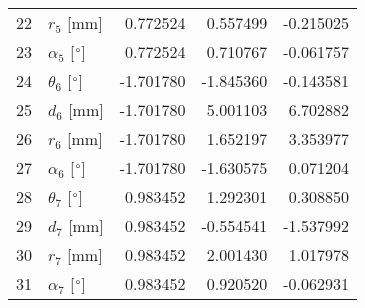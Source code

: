 \documentclass{standalone}%
\begin{document}
\begin{tabular}{llrrr}
22 &              $r_{5}$ [mm] &  0.772524 &   0.557499 &  -0.215025 \\
23 &  $\alpha_{5}$ [$\degree$] &  0.772524 &   0.710767 &  -0.061757 \\
24 &  $\theta_{6}$ [$\degree$] & -1.701780 &  -1.845360 &  -0.143581 \\
25 &              $d_{6}$ [mm] & -1.701780 &   5.001103 &   6.702882 \\
26 &              $r_{6}$ [mm] & -1.701780 &   1.652197 &   3.353977 \\
27 &  $\alpha_{6}$ [$\degree$] & -1.701780 &  -1.630575 &   0.071204 \\
28 &  $\theta_{7}$ [$\degree$] &  0.983452 &   1.292301 &   0.308850 \\
29 &              $d_{7}$ [mm] &  0.983452 &  -0.554541 &  -1.537992 \\
30 &              $r_{7}$ [mm] &  0.983452 &   2.001430 &   1.017978 \\
31 &  $\alpha_{7}$ [$\degree$] &  0.983452 &   0.920520 &  -0.062931 \\
\bottomrule
\end{tabular}
%
\end{document}
